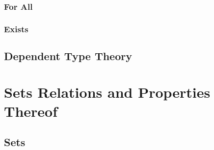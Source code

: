 \documentclass{book}
\begin{document}
\hypertarget{book__pandoc__debug__src__dmt1__lectures__l07_predicatelogic__05_quantifiers_all.lean.md}{}
\hypertarget{book__pandoc__debug__src__dmt1__lectures__l07_predicatelogic__05_quantifiers_all.lean.md__for-all}{%
\subsection{For All}\label{book__pandoc__debug__src__dmt1__lectures__l07_predicatelogic__05_quantifiers_all.lean.md__for-all}}

\hypertarget{book__pandoc__debug__src__dmt1__lectures__l07_predicatelogic__05_quantifiers_exists.lean.md}{}
\hypertarget{book__pandoc__debug__src__dmt1__lectures__l07_predicatelogic__05_quantifiers_exists.lean.md__exists}{%
\subsection{Exists}\label{book__pandoc__debug__src__dmt1__lectures__l07_predicatelogic__05_quantifiers_exists.lean.md__exists}}

\hypertarget{book__pandoc__debug__src__dmt1__lectures__l07_predicatelogic__06_dependenttypes.lean.md}{}
\hypertarget{book__pandoc__debug__src__dmt1__lectures__l07_predicatelogic__06_dependenttypes.lean.md__dependent-type-theory}{%
\section{Dependent Type Theory}\label{book__pandoc__debug__src__dmt1__lectures__l07_predicatelogic__06_dependenttypes.lean.md__dependent-type-theory}}

\hypertarget{book__pandoc__debug__src__settheory}{}
\hypertarget{book__pandoc__debug__src__settheory__sets-relations-and-properties-thereof}{%
\chapter{Sets Relations and Properties Thereof}\label{book__pandoc__debug__src__settheory__sets-relations-and-properties-thereof}}

\hypertarget{book__pandoc__debug__src__dmt1__lectures__l08_setsrelationsfunctions__c01_sets.lean.md}{}
\hypertarget{book__pandoc__debug__src__dmt1__lectures__l08_setsrelationsfunctions__c01_sets.lean.md__sets}{%
\section{Sets}\label{book__pandoc__debug__src__dmt1__lectures__l08_setsrelationsfunctions__c01_sets.lean.md__sets}}
\end{document}
